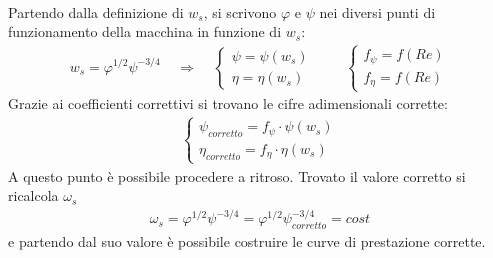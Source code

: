 \\Partendo dalla definizione di $w_s$, si scrivono $\varphi$ e $\psi$ nei diversi punti di funzionamento della macchina in funzione di $w_s$:
\begin{align*}
w_s= \varphi^{1/2}\psi^{-3/4} \;\;\;\; \Rightarrow \;\;\;\;
\begin{cases}
\psi = \psi(w_s)\\
\eta = \eta(w_s)
\end{cases} \;\;\;\;\;\;\;\;
\begin{cases}
f_{\psi} = f(Re)\\
f_{\eta} = f(Re)
\end{cases}
\end{align*}
Grazie ai coefficienti correttivi si trovano le cifre adimensionali corrette:
\begin{align*}
\begin{cases}
\psi_{corretto} = f_{\psi} \cdot \psi(w_s)\\
\eta_{corretto} = f_{\eta} \cdot \eta(w_s)
\end{cases}
\end{align*}
A questo punto è possibile procedere a ritroso. Trovato il valore corretto si ricalcola $\omega_s$
\begin{align*}
\omega_s = \varphi^{1/2} \psi^{-3/4} =  \varphi^{1/2} \psi_{corretto}^{-3/4} = cost
\end{align*}
e partendo dal suo valore è possibile costruire le curve di prestazione corrette.
